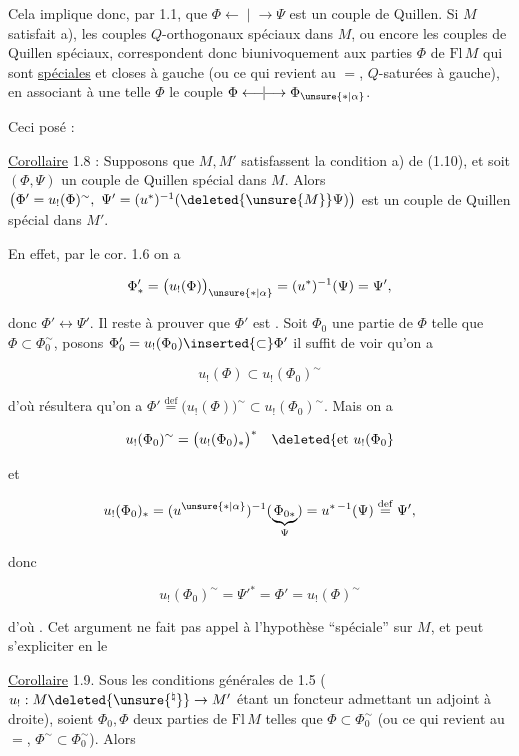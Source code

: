 Cela implique donc, par 1.1, que $\Phi \mathrel{\longleftarrow\!\mid\!\longrightarrow} \Psi$ est
un couple de Quillen. Si $M$ satisfait a),
les couples $Q$-orthogonaux spéciaux dans $M$,
ou encore les couples de Quillen spéciaux,
correspondent donc biunivoquement aux
parties $\Phi$ de $\mathrm{Fl}\,M$ qui sont \uline{spéciales} et
closes à gauche (ou ce qui revient au $=$, $Q$-saturées
à gauche), en  associant à une telle
$\Phi$ le couple $\Phi \mathrel{\longleftarrow\!\mid\!\longrightarrow} \Phi_{\unsure{*|\alpha}}$.

Ceci posé :

\uline{Corollaire} 1.8 : Supposons que $M,M'$ satisfassent
la condition a) de (1.10), et soit $(\Phi,\Psi)$
un couple de Quillen spécial dans $M$. Alors
$\big(\Phi'=u_!(\Phi)^{\sim},\ \Psi'=(u^*)^{-1}(\deleted{\unsure{M}}\Psi)\big)$ est un
couple de Quillen spécial dans $M'$.

En effet, par le cor. 1.6 on a

\[
\Phi'_*=\big(u_!(\Phi)\big)_{\unsure{*|\alpha}}=(u^{*})^{-1}(\Psi)=\Psi',
\]

donc $\Phi'\longleftrightarrow\Psi'$. Il reste à prouver que
$\Phi'$ est . Soit $\Phi_0$ une partie  de
$\Phi$ telle que $\Phi\subset\Phi_0^{\sim}$, posons $\Phi_0'=u_!(\Phi_0)\inserted{\subset}\Phi'$
il suffit de voir qu'on a

\[
u_!(\Phi)\subset u_!(\Phi_0)^{\sim}\tag*{$(*)$}
\]

d'où résultera qu'on a $\Phi'\overset{\mathrm{def}}{=}\big(u_!(\Phi)\big)^{\sim}\subset u_!(\Phi_0)^{\sim}$.
Mais on a

\[
u_!(\Phi_0)^{\sim}=\big(u_!(\Phi_0)_*\big)^*\quad \deleted{\text{et }u_!(\Phi_0}
\]

et

\[
u_!(\Phi_0)_*=(u^{\unsure{*|\alpha}})^{-1}(\underbrace{\Phi_{0*}}_{\Psi})=u^{*\, -1}(\Psi)\overset{\mathrm{def}}{=}\Psi',
\]

donc

\[
u_!(\Phi_0)^{\sim}=\Psi'{}^*=\Phi'=u_!(\Phi)^{\sim}
\]

d'où \unsure{(*)}. Cet argument ne fait pas appel
à l'hypothèse ``spéciale'' sur $M$, et peut
s'expliciter en le

\uline{Corollaire} 1.9. Sous les conditions générales de
\deleted{\unsure{(}}1.5\deleted{\unsure{)}} ($u_!:M\deleted{\unsure{^{\natural}}}\to M'$ étant un foncteur admettant
un adjoint à droite), soient $\Phi_0,\Phi$ deux
parties de $\mathrm{Fl}\,M$ telles que $\Phi\subset\Phi_0^{\sim}$ (ou ce
qui revient au $=$, $\Phi^{\sim}\subset\Phi_0^{\sim}$). Alors

